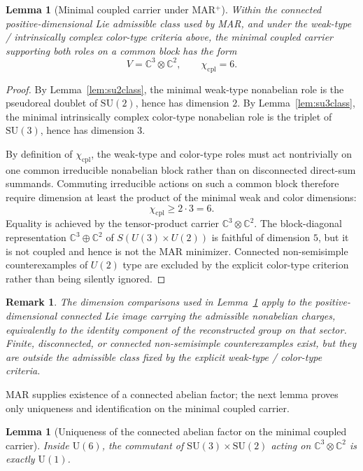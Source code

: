 \documentclass[11pt]{article}
\newtheorem{lemma}[theorem]{Lemma}
\newtheorem{remark}[theorem]{Remark}
\newcommand{\SU}{\mathrm{SU}}
\newcommand{\U}{\mathrm{U}}
\begin{document}
\begin{lemma}[Minimal coupled carrier under MAR$^+$]\label{lem:carrier}
Within the connected positive-dimensional Lie admissible class used by MAR, and under the weak-type / intrinsically complex color-type criteria above, the minimal coupled carrier supporting both roles on a common block has the form
\[
V=\mathbb C^3\otimes \mathbb C^2,
\qquad
\chi_{\mathrm{cpl}}=6.
\]
\end{lemma}

\begin{proof}
By Lemma~\ref{lem:su2class}, the minimal weak-type nonabelian role is the pseudoreal doublet of $\SU(2)$, hence has dimension $2$. By Lemma~\ref{lem:su3class}, the minimal intrinsically complex color-type nonabelian role is the triplet of $\SU(3)$, hence has dimension $3$.

By definition of $\chi_{\mathrm{cpl}}$, the weak-type and color-type roles must act nontrivially on one common irreducible nonabelian block rather than on disconnected direct-sum summands. Commuting irreducible actions on such a common block therefore require dimension at least the product of the minimal weak and color dimensions:
\[
\chi_{\mathrm{cpl}}\ge 2\cdot 3=6.
\]
Equality is achieved by the tensor-product carrier $\mathbb C^3\otimes\mathbb C^2$. The block-diagonal representation $\mathbb C^3\oplus \mathbb C^2$ of $S(U(3)\times U(2))$ is faithful of dimension $5$, but it is not coupled and hence is not the MAR minimizer. Connected non-semisimple counterexamples of $U(2)$ type are excluded by the explicit color-type criterion rather than being silently ignored.
\end{proof}

\begin{remark}\label{rem:connectedlie}
The dimension comparisons used in Lemma~\ref{lem:carrier} apply to the positive-dimensional connected Lie image carrying the admissible nonabelian charges, equivalently to the identity component of the reconstructed group on that sector. Finite, disconnected, or connected non-semisimple counterexamples exist, but they are outside the admissible class fixed by the explicit weak-type / color-type criteria.
\end{remark}

MAR supplies existence of a connected abelian factor; the next lemma proves only uniqueness and identification on the minimal coupled carrier.

\begin{lemma}[Uniqueness of the connected abelian factor on the minimal coupled carrier]\label{lem:commutant}
Inside $\U(6)$, the commutant of $\SU(3)\times\SU(2)$ acting on $\mathbb C^3\otimes \mathbb C^2$ is exactly $\U(1)$.
\end{lemma}
\end{document}
